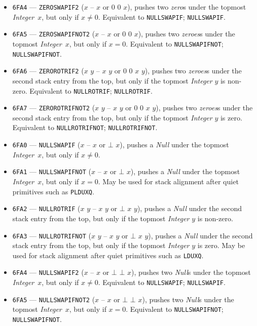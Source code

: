 \documentclass[12pt,oneside]{article}
\begin{document}
\begin{itemize}
\item {\tt 6FA4} --- {\tt ZEROSWAPIF2} ($x$ -- $x$ or $0$ $0$ $x$), pushes two {\em zero\/}s under the topmost {\em Integer\/}~$x$, but only if $x\neq0$. Equivalent to {\tt NULLSWAPIF}; {\tt NULLSWAPIF}.
\item {\tt 6FA5} --- {\tt ZEROSWAPIFNOT2} ($x$ -- $x$ or $0$ $0$ $x$), pushes two {\em zeroes\/}s under the topmost {\em Integer\/}~$x$, but only if $x=0$. Equivalent to {\tt NULLSWAPIFNOT}; {\tt NULLSWAPIFNOT}.
\item {\tt 6FA6} --- {\tt ZEROROTRIF2} ($x$ $y$ -- $x$ $y$ or $0$ $0$ $x$ $y$), pushes two {\em zeroes\/}s under the second stack entry from the top, but only if the topmost {\em Integer\/} $y$ is non-zero. Equivalent to {\tt NULLROTRIF}; {\tt NULLROTRIF}.
\item {\tt 6FA7} --- {\tt ZEROROTRIFNOT2} ($x$ $y$ -- $x$ $y$ or $0$ $0$ $x$ $y$), pushes two {\em zeroes\/}s under the second stack entry from the top, but only if the topmost {\em Integer\/} $y$ is zero. Equivalent to {\tt NULLROTRIFNOT}; {\tt NULLROTRIFNOT}.
\item {\tt 6FA0} --- {\tt NULLSWAPIF} ($x$ -- $x$ or $\bot$ $x$), pushes a {\em Null\/} under the topmost {\em Integer\/}~$x$, but only if $x\neq0$.
\item {\tt 6FA1} --- {\tt NULLSWAPIFNOT} ($x$ -- $x$ or $\bot$ $x$), pushes a {\em Null\/} under the topmost {\em Integer\/}~$x$, but only if $x=0$. May be used for stack alignment after quiet primitives such as {\tt PLDUXQ}.
\item {\tt 6FA2} --- {\tt NULLROTRIF} ($x$ $y$ -- $x$ $y$ or $\bot$ $x$ $y$), pushes a {\em Null\/} under the second stack entry from the top, but only if the topmost {\em Integer\/} $y$ is non-zero.
\item {\tt 6FA3} --- {\tt NULLROTRIFNOT} ($x$ $y$ -- $x$ $y$ or $\bot$ $x$ $y$), pushes a {\em Null\/} under the second stack entry from the top, but only if the topmost {\em Integer\/} $y$ is zero. May be used for stack alignment after quiet primitives such as {\tt LDUXQ}.
\item {\tt 6FA4} --- {\tt NULLSWAPIF2} ($x$ -- $x$ or $\bot$ $\bot$ $x$), pushes two {\em Null\/}s under the topmost {\em Integer\/}~$x$, but only if $x\neq0$. Equivalent to {\tt NULLSWAPIF}; {\tt NULLSWAPIF}.
\item {\tt 6FA5} --- {\tt NULLSWAPIFNOT2} ($x$ -- $x$ or $\bot$ $\bot$ $x$), pushes two {\em Null\/}s under the topmost {\em Integer\/}~$x$, but only if $x=0$. Equivalent to {\tt NULLSWAPIFNOT}; {\tt NULLSWAPIFNOT}.

\end{itemize}
\end{document}
